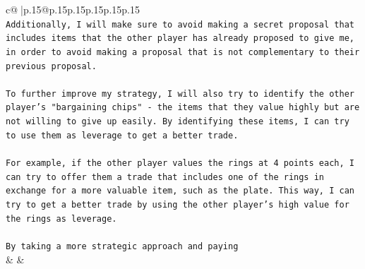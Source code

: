 \documentclass{article}
\begin{document}
{\begin{supertabular}{c@{$\;$}|p{.15\linewidth}@{}p{.15\linewidth}p{.15\linewidth}p{.15\linewidth}p{.15\linewidth}p{.15\linewidth}}
{{{\\ 
\texttt{Additionally, I will make sure to avoid making a secret proposal that includes items that the other player has already proposed to give me, in order to avoid making a proposal that is not complementary to their previous proposal.} \\
\\ 
\texttt{To further improve my strategy, I will also try to identify the other player's "bargaining chips" {-} the items that they value highly but are not willing to give up easily. By identifying these items, I can try to use them as leverage to get a better trade.} \\
\\ 
\texttt{For example, if the other player values the rings at 4 points each, I can try to offer them a trade that includes one of the rings in exchange for a more valuable item, such as the plate. This way, I can try to get a better trade by using the other player's high value for the rings as leverage.} \\
\\ 
\texttt{By taking a more strategic approach and paying} \\
            }
        }
    }
    & & \\ \\


\end{supertabular}}
\end{document}
